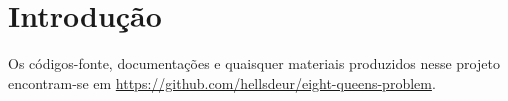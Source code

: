 \section{Introdução}

Os códigos-fonte, documentações e quaisquer materiais produzidos nesse projeto encontram-se em \href{https://github.com/hellsdeur/eight-queens-problem}{https://github.com/hellsdeur/eight-queens-problem}.